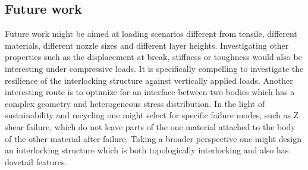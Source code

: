 \subsection{Future work}
Future work might be aimed at loading scenarios different from tensile, different materials, different nozzle sizes and different layer heights.
Investigating other properties such as the displacement at break, stiffness or toughness would also be interesting under compressive loads.
It is specifically compelling to investigate the resilience of the interlocking structure against vertically applied loads.
Another interesting route is to optimize for an interface between two bodies which has a complex geometry and heterogeneous stress distribution.
In the light of sustainability and recycling one might select for specific failure modes, such as Z shear failure, which do not leave parts of the one material attached to the body of the other material after failure.
Taking a broader perspective one might design an interlocking structure which is both topologically interlocking and also has dovetail features.

\iffalse
If the design constraint on the length of the transitional structure between the two material is released,
the manufacturing constraints are less relevant, which means that the geometry of the structure is less restricted.
The geometry of the microstructures could then be optimized for tailored mechanical properties.
In fact, such multi-material microstructures could be tailored for functionally graded materials.
With a relatively large geometry of the functionally graded multi-material lattice structure,
the ITIM lattice can again be used to ensure connectivity between the two materials,
while the meso-scale structure could be used to guarantee the functionally graded mechanical properties.
\fi
